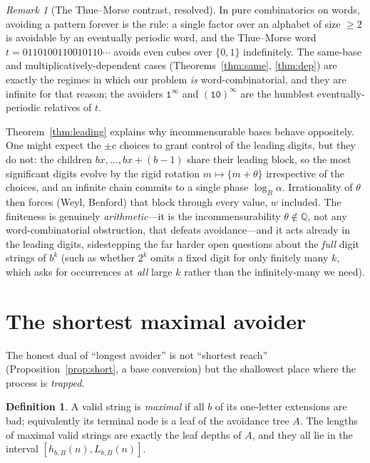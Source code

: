 \documentclass[11pt]{article}
\theoremstyle{plain}
\theoremstyle{definition}
\newtheorem{definition}{Definition}
\theoremstyle{remark}
\newtheorem{remark}{Remark}
\newcommand{\QQ}{\mathbb{Q}}
\newcommand{\Lbb}{L_{b,B}}
\newcommand{\hbb}{h_{b,B}}
\begin{document}
\begin{remark}[The Thue--Morse contrast, resolved]
In pure combinatorics on words, avoiding a pattern forever is the rule: a single factor over an alphabet of size $\ge2$ is avoidable by an eventually periodic word, and the Thue--Morse word $t=0110100110010110\cdots$ avoids even cubes over $\{0,1\}$ indefinitely. The same-base and multiplicatively-dependent cases (Theorems~\ref{thm:same}, \ref{thm:dep}) are exactly the regimes in which our problem \emph{is} word-combinatorial, and they are infinite for that reason; the avoiders $\texttt{1}^{\infty}$ and $(\texttt{10})^{\infty}$ are the humblest eventually-periodic relatives of $t$.

Theorem~\ref{thm:leading} explains why incommensurable bases behave oppositely. One might expect the $\pm c$ choices to grant control of the leading digits, but they do not: the children $bx,\dots,bx+(b-1)$ share their leading block, so the most significant digits evolve by the rigid rotation $m\mapsto\{m+\theta\}$ irrespective of the choices, and an infinite chain commits to a single phase $\log_B\alpha$. Irrationality of $\theta$ then forces (Weyl, Benford) that block through every value, $w$ included. The finiteness is genuinely \emph{arithmetic}---it is the incommensurability $\theta\notin\QQ$, not any word-combinatorial obstruction, that defeats avoidance---and it acts already in the leading digits, sidestepping the far harder open questions about the \emph{full} digit strings of $b^{k}$ (such as whether $2^{k}$ omits a fixed digit for only finitely many $k$, which asks for occurrences at \emph{all} large $k$ rather than the infinitely-many we need).
\end{remark}

\section{The shortest maximal avoider}\label{sec:dual}

The honest dual of ``longest avoider'' is not ``shortest reach'' (Proposition~\ref{prop:short}, a base conversion) but the shallowest place where the process is \emph{trapped}.

\begin{definition}
A valid string is \emph{maximal} if all $b$ of its one-letter extensions are bad; equivalently its terminal node is a leaf of the avoidance tree $A$. The lengths of maximal valid strings are exactly the leaf depths of $A$, and they all lie in the interval $[\hbb(n),\Lbb(n)]$.
\end{definition}
\end{document}
